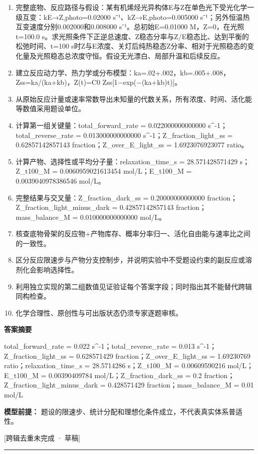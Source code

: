 \documentclass[UTF8,11pt,a4paper]{ctexart}
\begin{document}
\begin{enumerate}
\item 完整底物、反应路径与假设：某有机烯烃光异构体E与Z在单色光下受光化学一级互变：kE→Z,photo=0.02000 s⁻¹、kZ→E,photo=0.005000 s⁻¹；另外恒温热互变速度分别0.002000和0.008000 s⁻¹。总初始E=0.01000 M，Z=0，在光照t=100.0 s。求光照条件下正逆总速度、Z稳态分率与Z/E稳态比、达到平衡的松弛时间、t=100 s时Z与E浓度、关灯后纯热稳态Z分率、相对于光照稳态的变化量及光照稳态总浓度守恒。假设无光漂白、局部升温和后续反应。
\item 建立反应动力学、热力学或分布模型：ka=.02+.002，kb=.005+.008，Zss=ka/(ka+kb)，Z(t)=C0 Zss[1−exp(−(ka+kb)t)]。
\item 从原始反应计量或速率常数导出未知量的代数关系，所有浓度、时间、活化能等数值采用题设单位。
\item 计算第一组关键量：total\_forward\_rate = 0.022000000000000 s\textasciicircum{}-1；total\_reverse\_rate = 0.013000000000000 s\textasciicircum{}-1；Z\_fraction\_light\_ss = 0.62857142857143 fraction；Z\_over\_E\_light\_ss = 1.6923076923077 ratio。
\item 计算产物、选择性或平均分子量：relaxation\_time\_s = 28.571428571429 s；Z\_t100\_M = 0.0060959021613454 mol/L；E\_t100\_M = 0.0039040978386546 mol/L。
\item 完整结果与交叉量：Z\_fraction\_dark\_ss = 0.20000000000000 fraction；Z\_fraction\_light\_minus\_dark = 0.42857142857143 fraction；mass\_balance\_M = 0.010000000000000 mol/L。
\item 核查底物骨架的反应物+产物库存、概率分率归一、活化自由能与速率比之间的一致性。
\item 区分反应限速步与产物分支控制步，并说明实验中不受题设约束的副反应或溶剂化会影响选择性。
\item 利用独立实现的第二组数值见证验证每个答案字段；同时指出其不能替代跨辑同构检查。
\item 化学合理性、原创性与可出版状态仍须专家逐题审核。
\end{enumerate}
\noindent\textbf{答案摘要}\par
total\_forward\_rate = 0.022 s\textasciicircum{}-1；total\_reverse\_rate = 0.013 s\textasciicircum{}-1；Z\_fraction\_light\_ss = 0.628571429 fraction；Z\_over\_E\_light\_ss = 1.69230769 ratio；relaxation\_time\_s = 28.5714286 s；Z\_t100\_M = 0.00609590216 mol/L；E\_t100\_M = 0.00390409784 mol/L；Z\_fraction\_dark\_ss = 0.2 fraction；Z\_fraction\_light\_minus\_dark = 0.428571429 fraction；mass\_balance\_M = 0.01 mol/L\par
\noindent\textbf{模型前提：}
题设的限速步、统计分配和理想化条件成立，不代表真实体系普适性。\par
\noindent\textcolor{red!65!black}{[跨辑去重未完成 · 草稿]} \par
\medskip\hrule\medskip
{}
\end{document}
